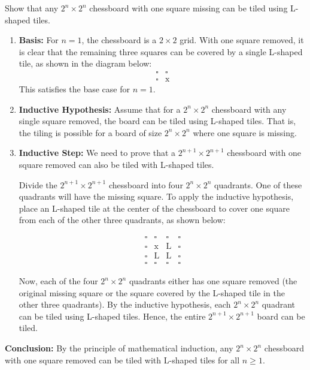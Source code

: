     \begin{example}
        Show that any \( 2^n \times 2^n \) chessboard with one square missing can be tiled using L-shaped tiles.

        \begin{enumerate}
            \item \textbf{Basis:} 
            For \( n = 1 \), the chessboard is a \( 2 \times 2 \) grid. With one square removed, it is clear that the remaining three squares can be covered by a single L-shaped tile, as shown in the diagram below:
            \[
            \begin{matrix}
            \square & \square \\
            \square & \text{x} 
            \end{matrix}
            \]
            This satisfies the base case for \( n = 1 \).

            \item \textbf{Inductive Hypothesis:} 
            Assume that for a \( 2^n \times 2^n \) chessboard with any single square removed, the board can be tiled using L-shaped tiles. That is, the tiling is possible for a board of size \( 2^n \times 2^n \) where one square is missing.

            \item \textbf{Inductive Step:} 
            We need to prove that a \( 2^{n+1} \times 2^{n+1} \) chessboard with one square removed can also be tiled with L-shaped tiles.

            Divide the \( 2^{n+1} \times 2^{n+1} \) chessboard into four \( 2^n \times 2^n \) quadrants. One of these quadrants will have the missing square. To apply the inductive hypothesis, place an L-shaped tile at the center of the chessboard to cover one square from each of the other three quadrants, as shown below:
            
            \[
            \begin{matrix}
            \square & \square & \square & \square \\
            \square & \text{x} & \text{L} & \square \\
            \square & \text{L} & \text{L} & \square \\
            \square & \square & \square & \square 
            \end{matrix}
            \]
            
            Now, each of the four \( 2^n \times 2^n \) quadrants either has one square removed (the original missing square or the square covered by the L-shaped tile in the other three quadrants). By the inductive hypothesis, each \( 2^n \times 2^n \) quadrant can be tiled using L-shaped tiles. Hence, the entire \( 2^{n+1} \times 2^{n+1} \) board can be tiled.

        \end{enumerate}

        \textbf{Conclusion:} By the principle of mathematical induction, any \( 2^n \times 2^n \) chessboard with one square removed can be tiled with L-shaped tiles for all \( n \geq 1 \).
    \end{example}

